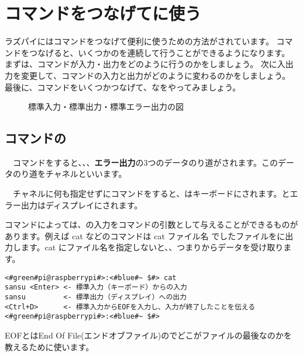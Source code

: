 \newpage
\section{コマンドをつなげてに使う}
ラズパイにはコマンドをつなげて便利に使うための方法がされています。
コマンドをつなげると、いくつかのを連続して行うことができるようになります。
まずは、コマンドが入力・出力をどのように行うのかをしましょう。
次に入出力を変更して、コマンドの入力と出力がどのように変わるのかをしましょう。
最後に、コマンドをいくつかつなげて、なをやってみましょう。

\begin{figure}[h]
    \centering
    
    \caption{標準入力・標準出力・標準エラー出力の図}
    \label{ch03:stdioerr}
\end{figure}

\subsection{コマンドの}
　コマンドをすると、{\bf {}}、{\bf {}}、{\bf {}エラー出力}の3つのデータのり道がされます。このデータのり道をチャネルといいます。

　チャネルに何も指定せずにコマンドをすると、はキーボードにされます。とエラー出力はディスプレイにされます。


コマンドによっては、の入力をコマンドの引数として与えることができるものがあります。例えば cat などのコマンドは cat ファイル名 でしたファイルをに出力します。cat にファイル名を指定しないと、、つまりからデータを受け取ります。

\begin{lstlisting}[caption=catの標準入力・標準出力, label=stdioCat]
<#green#pi@raspberrypi#>:<#blue#~ $#> cat 
sansu <Enter> <- 標準入力（キーボード）からの入力
sansu         <- 標準出力（ディスプレイ）への出力
<Ctrl+D>      <- 標準入力からEOFを入力し、入力が終了したことを伝える
<#green#pi@raspberrypi#>:<#blue#~ $#>
\end{lstlisting}
EOFとはEnd Of File(エンドオブファイル)のでどこがファイルの最後なのかを教えるために使います。


